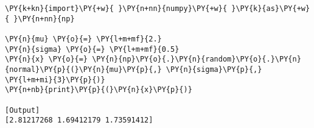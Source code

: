 \begin{Verbatim}[label=\makebox{\href{https://github.com/unipi-physics-labs/lab1-notes/tree/main/snippy/np.random.normal.py}{https://github.com/.../np.random.normal.py}},commandchars=\\\{\}]
\PY{k+kn}{import}\PY{+w}{ }\PY{n+nn}{numpy}\PY{+w}{ }\PY{k}{as}\PY{+w}{ }\PY{n+nn}{np}

\PY{n}{mu} \PY{o}{=} \PY{l+m+mf}{2.}
\PY{n}{sigma} \PY{o}{=} \PY{l+m+mf}{0.5}
\PY{n}{x} \PY{o}{=} \PY{n}{np}\PY{o}{.}\PY{n}{random}\PY{o}{.}\PY{n}{normal}\PY{p}{(}\PY{n}{mu}\PY{p}{,} \PY{n}{sigma}\PY{p}{,} \PY{l+m+mi}{3}\PY{p}{)}
\PY{n+nb}{print}\PY{p}{(}\PY{n}{x}\PY{p}{)}

[Output]
[2.81217268 1.69412179 1.73591412]
\end{Verbatim}
